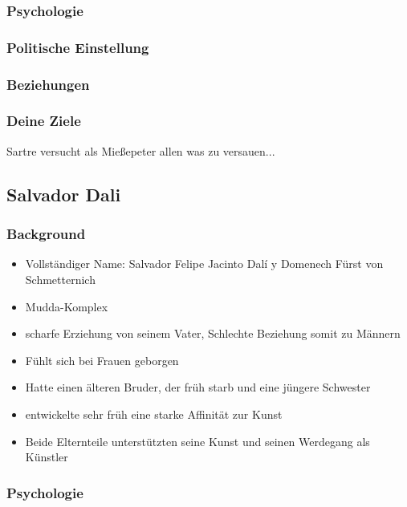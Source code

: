 \documentclass[12pt, a4paper, openany]{report}
\begin{document}
\subsubsection{Psychologie}
\subsubsection{Politische Einstellung}
\subsubsection{Beziehungen}
\subsubsection{Deine Ziele}
Sartre versucht als Mießepeter allen was zu versauen...



\subsection{Salvador Dali}
\subsubsection{Background}
\begin{itemize}
\item Vollständiger Name: Salvador Felipe Jacinto Dalí y Domenech Fürst von Schmetternich
\item Mudda-Komplex
\item scharfe Erziehung von seinem Vater, Schlechte Beziehung somit zu Männern
\item Fühlt sich bei Frauen geborgen 
\item Hatte einen älteren Bruder, der früh starb und eine jüngere Schwester
\item entwickelte sehr früh eine starke Affinität zur Kunst
\item Beide Elternteile unterstützten seine Kunst und seinen Werdegang als Künstler
\end{itemize}

\subsubsection{Psychologie}
\end{document}
